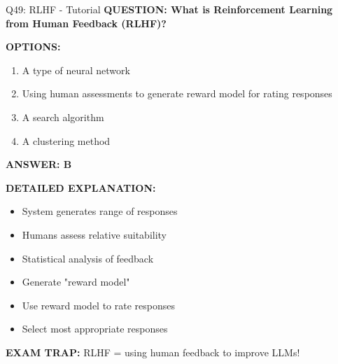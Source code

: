 \documentclass[8pt]{beamer}
\begin{document}
	\begin{frame}{Q49: RLHF - Tutorial}
		\fontsize{6.5}{7.5}\selectfont
		\textbf{QUESTION: What is Reinforcement Learning from Human Feedback (RLHF)?}
		
		\vspace{0.1cm}
		\textbf{OPTIONS:}
		\begin{enumerate}
			\item A type of neural network
			\item Using human assessments to generate reward model for rating responses
			\item A search algorithm
			\item A clustering method
		\end{enumerate}
		
		\vspace{0.1cm}
		\textcolor{myblue}{\textbf{ANSWER: B}}
		
		\vspace{0.1cm}
		\textbf{DETAILED EXPLANATION:}
		\begin{itemize}
			\item System generates range of responses
			\item Humans assess relative suitability
			\item Statistical analysis of feedback
			\item Generate "reward model"
			\item Use reward model to rate responses
			\item Select most appropriate responses
		\end{itemize}
		
		\vspace{0.1cm}
		\textcolor{myred}{\textbf{EXAM TRAP:}} RLHF = \textcolor{myblue}{using human feedback to improve LLMs}!
	\end{frame}
	
\end{document}
